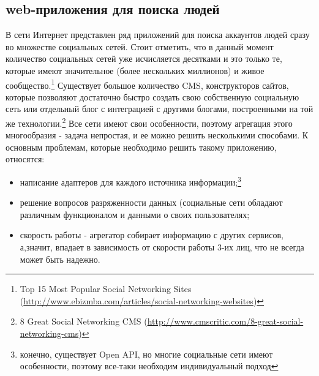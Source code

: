 \begin{itemize}
\subsection{web-приложения для поиска людей}
В сети Интернет представлен ряд приложений для поиска аккаунтов людей сразу во множестве социальных сетей. Стоит отметить, что в данный момент количество социальных сетей уже исчисляется десятками и это только те, которые имеют значительное (более нескольких миллионов) и живое сообщество.\footnote{Top 15 Most Popular Social Networking Sites (\url{http://www.ebizmba.com/articles/social-networking-websites})}
 Существует большое количество CMS,%
конструкторов сайтов, которые позволяют достаточно быстро создать свою собственную социальную сеть или отдельный блог с интеграцией с другими блогами, построенными на той же технологии.\footnote{8 Great Social Networking CMS (\url{http://www.cmscritic.com/8-great-social-networking-cms})} 
Все сети имеют свои особенности,  поэтому агрегация этого многообразия - задача непростая, и ее можно решить несколькими способами. К основным проблемам, которые необходимо решить такому приложению, относятся:
\begin{itemize}
\item написание адаптеров для каждого источника информации;\footnote{конечно, существует Open API, но многие социальные сети имеют особенности, поэтому все-таки необходим индивидуальный подход}
\item решение вопросов разряженности данных (социальные сети обладают различным функционалом и данными о своих пользователях;
\item скорость работы - агрегатор собирает информацию с других сервисов, а,значит, впадает в зависимость от скорости работы 3-их лиц, что не всегда может быть надежно.
\end{itemize}


\end{itemize}
